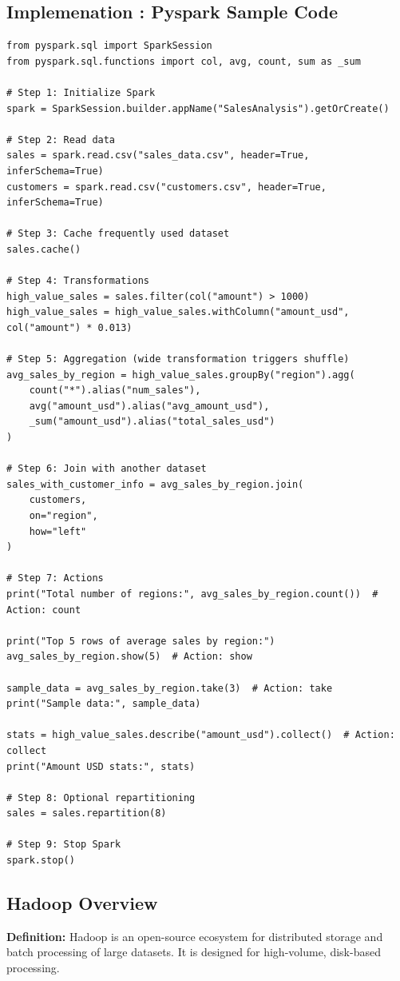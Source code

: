 \documentclass[10pt,a4paper]{article}
\begin{document}
	\subsection{Implemenation : Pyspark Sample Code}
		\begin{lstlisting}[style=github]
from pyspark.sql import SparkSession
from pyspark.sql.functions import col, avg, count, sum as _sum

# Step 1: Initialize Spark
spark = SparkSession.builder.appName("SalesAnalysis").getOrCreate()

# Step 2: Read data
sales = spark.read.csv("sales_data.csv", header=True, inferSchema=True)
customers = spark.read.csv("customers.csv", header=True, inferSchema=True)

# Step 3: Cache frequently used dataset
sales.cache()

# Step 4: Transformations
high_value_sales = sales.filter(col("amount") > 1000)
high_value_sales = high_value_sales.withColumn("amount_usd", col("amount") * 0.013)

# Step 5: Aggregation (wide transformation triggers shuffle)
avg_sales_by_region = high_value_sales.groupBy("region").agg(
	count("*").alias("num_sales"),
	avg("amount_usd").alias("avg_amount_usd"),
	_sum("amount_usd").alias("total_sales_usd")
)

# Step 6: Join with another dataset
sales_with_customer_info = avg_sales_by_region.join(
	customers,
	on="region",
	how="left"
)

# Step 7: Actions
print("Total number of regions:", avg_sales_by_region.count())  # Action: count

print("Top 5 rows of average sales by region:")
avg_sales_by_region.show(5)  # Action: show

sample_data = avg_sales_by_region.take(3)  # Action: take
print("Sample data:", sample_data)

stats = high_value_sales.describe("amount_usd").collect()  # Action: collect
print("Amount USD stats:", stats)

# Step 8: Optional repartitioning
sales = sales.repartition(8)

# Step 9: Stop Spark
spark.stop()
		\end{lstlisting}

	
	
	\subsection{Hadoop Overview}
	
	\textbf{Definition:} Hadoop is an open-source ecosystem for distributed storage and batch processing of large datasets. It is designed for high-volume, disk-based processing.
	
\end{document}
